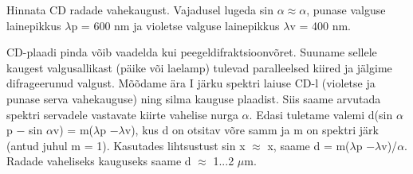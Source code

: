 
Hinnata CD radade vahekaugust. Vajadusel lugeda sin $\alpha \approx \alpha$, punase valguse lainepikkus $\lambda$p = 600 nm ja violetse valguse lainepikkus $\lambda$v = 400 nm.

\hint

\solu
CD-plaadi pinda võib vaadelda kui peegeldifraktsioonvõret. Suuname sellele kaugest valgusallikast (päike või laelamp) tulevad paralleelsed kiired ja jälgime difrageerunud valgust. Mõõdame ära I järku spektri laiuse CD-l (violetse ja punase serva vahekauguse) ning silma kauguse plaadist. Siis saame arvutada spektri servadele vastavate kiirte vahelise nurga $\alpha$. Edasi tuletame valemi d(sin $\alpha$p $-$ sin $\alpha$v) = m($\lambda$p $- \lambda$v), kus d on otsitav võre samm ja m on spektri järk (antud juhul m = 1). Kasutades lihtsustust sin x $\approx$ x, saame d = m($\lambda$p $- \lambda$v)/$\alpha$. Radade vaheliseks kauguseks saame d $\approx$ 1...2 $\mu$m.
\probend
